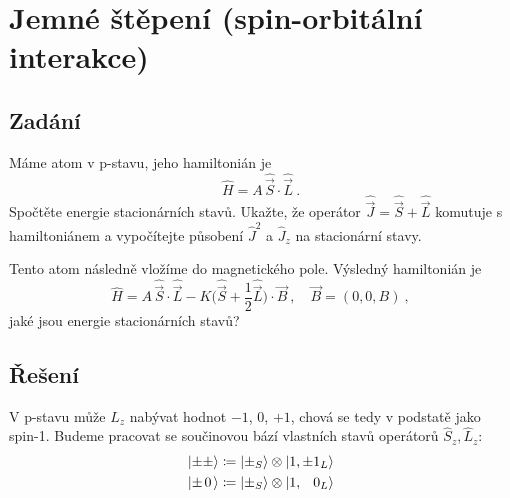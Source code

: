 \documentclass[10pt,a4paper]{article}
\def\ph{\phantom}
\newcommand*{\mask}[2]{%
    \mathord{\makebox[\widthof{\(#1\)}]{\(#2\)}}%
}
\newcommand{\ket}[1]{\left| #1 \right>}
\newcommand{\vechat}[1]{\hat{\vec{#1}}}
\def\0{\mask{+}{0}}
\begin{document}
\section{Jemné štěpení (spin-orbitální interakce)}

\subsection{Zadání}
Máme atom v p-stavu, jeho hamiltonián je
\begin{equation*}
    \hat H = A \, \vechat S \cdot \vechat L \: .
\end{equation*}
Spočtěte energie stacionárních stavů. Ukažte, že operátor $\vechat J = \vechat S + \vechat L$ komutuje s hamiltoniánem a vypočítejte působení $\hat J^2$ a $\hat J_z$ na stacionární stavy.

Tento atom následně vložíme do magnetického pole. Výsledný hamiltonián je
\begin{equation*}
    \hat H
    = A \, \vechat S \cdot \vechat L
    - K \big( \vechat S + \frac{1}{2} \vechat L \big) \cdot \vec B
    \: , \quad
    \vec B = (0, 0, B)
    \: ,
\end{equation*}
jaké jsou energie stacionárních stavů?

\subsection{Řešení}
V p-stavu může $L_z$ nabývat hodnot $-1$, $0$, $+1$, chová se tedy v podstatě jako spin-1. Budeme pracovat se součinovou bází vlastních stavů operátorů $\hat S_z, \hat L_z$:
\begin{align*}
    \ket{\pm\pm} &\coloneqq
    \ket{\pm_S} \otimes \ket{1, \pm 1_L}
    \\
    \ket{\pm\0} &\coloneqq
    \ket{\pm_S} \otimes \ket{1, \ph{\pm} 0_L}
\end{align*}
\end{document}
